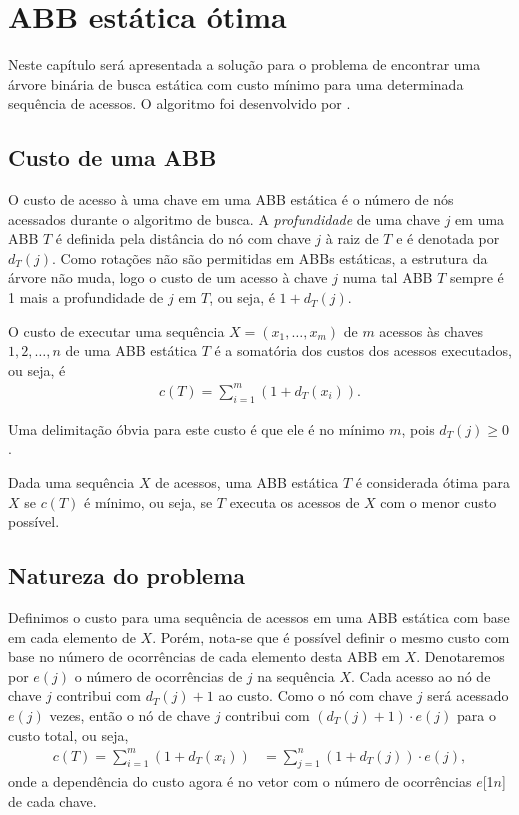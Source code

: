 
\chapter{ABB estática ótima}
\label{cap:abb-estatica-otima}

Neste capítulo será apresentada a solução para o problema de encontrar uma árvore binária de busca estática com custo mínimo para uma determinada sequência de acessos. O algoritmo foi desenvolvido por \cite{knuth}.

\section{Custo de uma ABB}

O custo de acesso à uma chave em uma ABB estática é o número de nós acessados durante o algoritmo de busca. A \textit{profundidade} de uma chave $j$ em uma ABB $T$ é definida pela distância do nó com chave $j$ à raiz de $T$ e é denotada por $d_T(j)$. Como rotações não são permitidas em ABBs estáticas, a estrutura da árvore não muda, logo o custo de um acesso à chave $j$ numa tal ABB $T$ sempre é 1 mais a profundidade de $j$ em $T$, ou seja, é $1 + d_T(j)$.

O custo de executar uma sequência $X = (x_{1},\ldots,x_{m})$ de $m$ acessos às chaves $1, 2,\ldots,n$ de uma ABB estática $T$ é a somatória dos custos dos acessos executados, ou seja, é
\begin{align*}
c(T) = \sum_{i=1}^{m} (1 + d_T(x_i)).
\end{align*}

Uma delimitação óbvia para este custo é que ele é no mínimo $m$, pois $d_T(j) \geq 0$.

Dada uma sequência $X$ de acessos, uma ABB estática $T$ é considerada ótima para $X$ se $c(T)$ é mínimo, ou seja, se $T$ executa os acessos de $X$ com o menor custo possível.

\section{Natureza do problema}

Definimos o custo para uma sequência de acessos em uma ABB estática com base em cada elemento de $X$. Porém, nota-se que é possível definir o mesmo custo com base no número de ocorrências de cada elemento desta ABB em $X$. Denotaremos por $e(j)$ o número de ocorrências de $j$ na sequência $X$.
Cada acesso ao nó de chave $j$ contribui com $d_T(j) + 1$ ao custo. Como o nó com chave $j$ será acessado $e(j)$ vezes, então o nó de chave $j$ contribui com $(d_T(j) + 1)  \cdot e(j)$ para o custo total, ou seja,
\begin{align*}
c(T) = \sum_{i=1}^{m} (1 + d_T(x_i)) &= \sum_{j=1}^{n} (1 + d_T(j)) \cdot e(j),
\end{align*}
onde a dependência do custo agora é no vetor com o número de ocorrências $e$[1\tdots$n$] de cada chave.

